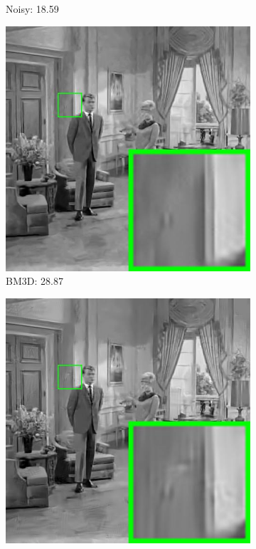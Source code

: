 \begin{figure}
\begin{subfigure}[t]{0.24\textwidth}
		\caption{Noisy: 18.59}
    \end{subfigure}
    \hfill
    \begin{subfigure}[t]{0.24\textwidth}
        \centering
        \includegraphics[width=1\textwidth]{images/pgpd/br_BM3D_30_couple.jpg}
		\caption{BM3D: 28.87}
    \end{subfigure}
    \hfill
    \begin{subfigure}[t]{0.24\textwidth}
        \centering
        \includegraphics[width=1\textwidth]{images/pgpd/br_LSSC_30_couple.jpg}

\end{subfigure}
\end{figure}

